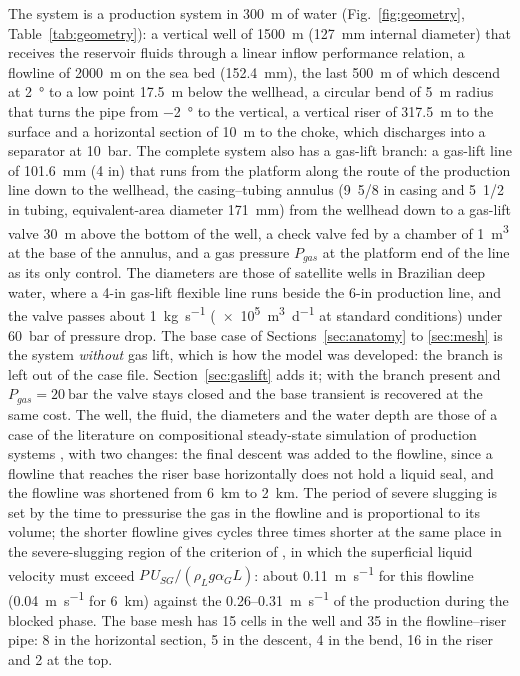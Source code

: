 \documentclass[a4paper,fleqn]{cas-sc}
\begin{document}
The system is a production system in \SI{300}{\metre} of water (Fig.~\ref{fig:geometry}, Table~\ref{tab:geometry}): a vertical well of \SI{1500}{\metre} (\SI{127}{\milli\metre} internal diameter) that receives the reservoir fluids through a linear inflow performance relation, a flowline of \SI{2000}{\metre} on the sea bed (\SI{152.4}{\milli\metre}), the last \SI{500}{\metre} of which descend at \SI{2}{\degree} to a low point \SI{17.5}{\metre} below the wellhead, a circular bend of \SI{5}{\metre} radius that turns the pipe from \SI{-2}{\degree} to the vertical, a vertical riser of \SI{317.5}{\metre} to the surface and a horizontal section of \SI{10}{\metre} to the choke, which discharges into a separator at \SI{10}{\bar}. The complete system also has a gas-lift branch: a gas-lift line of \SI{101.6}{\milli\metre} (4 in) that runs from the platform along the route of the production line down to the wellhead, the casing--tubing annulus (9~5/8 in casing and 5~1/2 in tubing, equivalent-area diameter \SI{171}{\milli\metre}) from the wellhead down to a gas-lift valve \SI{30}{\metre} above the bottom of the well, a check valve fed by a chamber of \SI{1}{\cubic\metre} at the base of the annulus, and a gas pressure $P_{gas}$ at the platform end of the line as its only control. The diameters are those of satellite wells in Brazilian deep water, where a 4-in gas-lift flexible line runs beside the 6-in production line, and the valve passes about \SI{1}{\kilogram\per\second} (\SI{e5}{\cubic\metre\per\day} at standard conditions) under \SI{60}{\bar} of pressure drop. The base case of Sections~\ref{sec:anatomy} to \ref{sec:mesh} is the system \emph{without} gas lift, which is how the model was developed: the branch is left out of the case file. Section~\ref{sec:gaslift} adds it; with the branch present and $P_{gas} = \SI{20}{\bar}$ the valve stays closed and the base transient is recovered at the same cost. The well, the fluid, the diameters and the water depth are those of a case of the literature on compositional steady-state simulation of production systems \citep{carvalho2022}, with two changes: the final descent was added to the flowline, since a flowline that reaches the riser base horizontally does not hold a liquid seal, and the flowline was shortened from \SI{6}{\kilo\metre} to \SI{2}{\kilo\metre}. The period of severe slugging is set by the time to pressurise the gas in the flowline and is proportional to its volume; the shorter flowline gives cycles three times shorter at the same place in the severe-slugging region of the criterion of \citet{boe1981}, in which the superficial liquid velocity must exceed $P\,U_{SG}/(\rho_L g \alpha_G L)$: about \SI{0.11}{\metre\per\second} for this flowline (\SI{0.04}{\metre\per\second} for \SI{6}{\kilo\metre}) against the 0.26--\SI{0.31}{\metre\per\second} of the production during the blocked phase. The base mesh has 15 cells in the well and 35 in the flowline--riser pipe: 8 in the horizontal section, 5 in the descent, 4 in the bend, 16 in the riser and 2 at the top.
\end{document}
